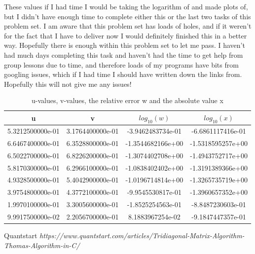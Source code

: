 \documentclass[english,notitlepage]{revtex4-1}  %
\begin{document}
 These values if I had time I would be taking the logarithm of and made plots of, but I didn't have enough time to complete either this or the last two tasks of this problem set. I am aware that this problem set has loads of holes, and if it weren't for the fact that I have to deliver now I would definitely finished this in a better way. Hopefully there is enough within this problem set to let me pass. I haven't had much days completing this task and haven't had the time to get help from group lessons due to time, and therefore loads of my programs have bits from googling issues, which if I had time I should have written down the links from. Hopefully this will not give me any issues!
\begin{table}%
    \centering
    \caption{u-values, v-values, the relative error w and the absolute value x}
    \begin{tabular}{c@{\hspace{1cm}} c c c}
        \hline
         u & v & $log_{10}(w)$ & $log_{10}(x)$ \\
        \hline
  5.3212500000e-01  & 3.1764400000e-01 & -3.9462483734e-01 & -6.6861117416e-01\\
  6.6467400000e-01  & 6.3528800000e-01&  -1.3544682166e+00  &-1.5318595257e+00\\
  6.5022700000e-01 & 6.8226200000e-01 & -1.3074402708e+00  &-1.4943752717e+00\\
  5.8170300000e-01 & 6.2966100000e-01 & -1.0838402402e+00 & -1.3191389366e+00\\
  4.9328500000e-01 & 5.4042900000e-01&  -1.0196714814e+00  &-1.3265735719e+00\\
  3.9754800000e-01 & 4.3772100000e-01 & -9.9545530817e-01  &-1.3960657352e+00\\
  1.9970100000e-01 & 3.3005600000e-01 & -1.8525254563e-01 & -8.8487230603e-01\\
  9.9917500000e-02 & 2.2056700000e-01 & 8.1883967254e-02 & -9.1847447357e-01\\
        \hline
    \end{tabular}\label{tab:output_table}
\end{table}













\begin{thebibliography}{1}

   Quantstart {\em https://www.quantstart.com/articles/Tridiagonal-Matrix-Algorithm-Thomas-Algorithm-in-C/}



  \end{thebibliography}
\end{document}
